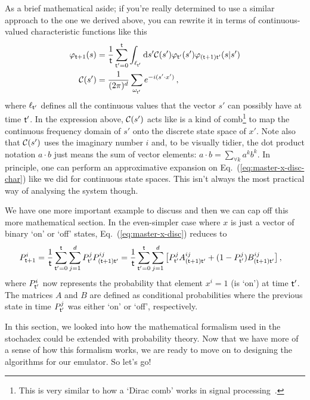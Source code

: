 As a brief mathematical aside; if you're really determined to use a similar approach to the one we derived above, you can rewrite it in terms of continuous-valued characteristic functions like this
\begin{align}
\varphi_{{\sf t}+1}(s) &= \frac{1}{{\sf t}}\sum_{{\sf t}'=0}^{\sf t}\int_{\ell_{{\sf t}'}}{\rm d}s' {\cal C}(s') \varphi_{{\sf t}'}(s') \varphi_{({\sf t}+1){\sf t}'}(s \vert s') \label{eq:master-x-disc-char} \\
{\cal C}(s') &= \frac{1}{(2\pi )^d}\sum_{\omega_{{\sf t}'}}e^{-i(s'\cdot x')} \,,
\end{align}
where $\ell_{{\sf t}'}$ defines all the continuous values that the vector $s'$ can possibly have at time ${\sf t}'$. In the expression above, ${\cal C}(s')$ acts like is a kind of comb\footnote{This is very similar to how a `Dirac comb' works in signal processing~\cite{brandwood2012fourier}.} to map the continuous frequency domain of $s'$ onto the discrete state space of $x'$. Note also that ${\cal C}(s')$ uses the imaginary number $i$ and, to be visually tidier, the dot product notation $a\cdot b$ just means the sum of vector elements: $a\cdot b = \sum_{\forall k}a^kb^k$. In principle, one can perform an approximative expansion on Eq.~(\ref{eq:master-x-disc-char}) like we did for continuous state spaces. This isn't always the most practical way of analysing the system though. 

We have one more important example to discuss and then we can cap off this more mathematical section. In the even-simpler case where $x$ is just a vector of binary `on' or `off' states, Eq.~(\ref{eq:master-x-disc}) reduces to
\begin{align}
P^i_{{\sf t}+1} &= \frac{1}{{\sf t}}\sum_{{\sf t}'=0}^{\sf t} \sum_{j=1}^d P^j_{{\sf t}'} P^{ij}_{({\sf t}+1){\sf t}'} = \frac{1}{{\sf t}}\sum_{{\sf t}'=0}^{\sf t} \sum_{j=1}^d \big[ P^j_{{\sf t}'} A^{ij}_{({\sf t}+1){\sf t}'} + (1-P^j_{{\sf t}'}) B^{ij}_{({\sf t}+1){\sf t}'} \big] \label{eq:master-x-disc-binary}\,,
\end{align}
where $P^i_{{\sf t}'}$ now represents the probability that element $x^i=1$ (is `on') at time ${\sf t}'$. The matrices $A$ and $B$ are defined as conditional probabilities where the previous state in time $P^j_{{\sf t}'}$ was either `on' or `off', respectively.

In this section, we looked into how the mathematical formalism used in the stochadex could be extended with probability theory. Now that we have more of a sense of how this formalism works, we are ready to move on to designing the algorithms for our emulator. So let's go!

